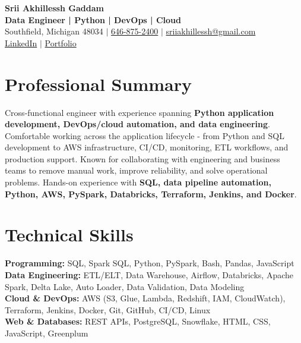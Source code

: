 \documentclass[letterpaper,10pt]{article}
\begin{document}
\fontsize{9.35pt}{10.45pt}\selectfont

\begin{center}
    {\LARGE \textbf{Srii Akhillessh Gaddam}} \\[-1pt]
    \textbf{Data Engineer | Python | DevOps | Cloud} \\[2pt]
    Southfield, Michigan 48034 $|$
    \href{tel:6468752400}{646-875-2400} $|$
    \href{mailto:sriiakhillessh@gmail.com}{sriiakhillessh@gmail.com} \\[1pt]
    \href{https://www.linkedin.com/in/srii-akhiilessh-gaddam-b48668191/}{LinkedIn} $|$
    \href{https://sriiakhillesshg.github.io/portfolio/}{Portfolio}
\end{center}
\vspace{-8pt}

\section{Professional Summary}
\small{Cross-functional engineer with experience spanning \textbf{Python application development, DevOps/cloud automation, and data engineering}. Comfortable working across the application lifecycle - from Python and SQL development to AWS infrastructure, CI/CD, monitoring, ETL workflows, and production support. Known for collaborating with engineering and business teams to remove manual work, improve reliability, and solve operational problems. Hands-on experience with \textbf{SQL, data pipeline automation, Python, AWS, PySpark, Databricks, Terraform, Jenkins, and Docker}.}

\section{Technical Skills}
\small{
\textbf{Programming:} SQL, Spark SQL, Python, PySpark, Bash, Pandas, JavaScript \\
\textbf{Data Engineering:} ETL/ELT, Data Warehouse, Airflow, Databricks, Apache Spark, Delta Lake, Auto Loader, Data Validation, Data Modeling \\
\textbf{Cloud \& DevOps:} AWS (S3, Glue, Lambda, Redshift, IAM, CloudWatch), Terraform, Jenkins, Docker, Git, GitHub, CI/CD, Linux \\
\textbf{Web \& Databases:} REST APIs, PostgreSQL, Snowflake, HTML, CSS, JavaScript, Greenplum
}
\end{document}
